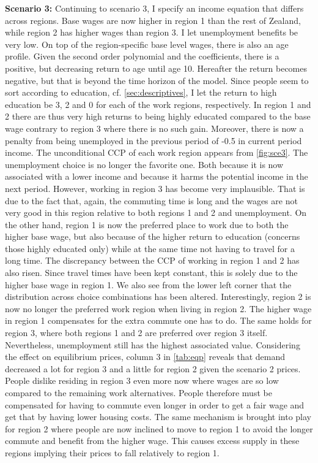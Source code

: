 \textbf{Scenario 3:} Continuing to scenario 3, I specify an income equation that differs across regions. Base wages are now higher in region 1 than the rest of Zealand, while region 2 has higher wages than region 3. I let unemployment benefits be very low. On top of the region-specific base level wages, there is also an age profile. Given the second order polynomial and the coefficients, there is a positive, but decreasing return to age until age 10. Hereafter the return becomes negative, but that is beyond the time horizon of the model. Since people seem to sort according to education, cf. \autoref{sec:descriptives}, I let the return to high education be 3, 2 and 0 for each of the work regions, respectively. In region 1 and 2 there are thus very high returns to being highly educated compared to the base wage contrary to region 3 where there is no such gain. Moreover, there is now a penalty from being unemployed in the previous period of -0.5 in current period income. The unconditional CCP of each work region appears from \autoref{fig:sce3}. The unemployment choice is no longer the favorite one. Both because it is now associated with a lower income and because it harms the potential income in the next period. However, working in region 3 has become very implausible. That is due to the fact that, again, the commuting time is long and the wages are not very good in this region relative to both regions 1 and 2 and unemployment. On the other hand, region 1 is now the preferred place to work due to both the higher base wage, but also because of the higher return to education (concerns those highly educated only) while at the same time not having to travel for a long time. The discrepancy between the CCP of working in region 1 and 2 has also risen. Since travel times have been kept constant, this is solely due to the higher base wage in region 1. We also see from the lower left corner that the distribution across choice combinations has been altered. Interestingly, region 2 is now no longer the preferred work region when living in region 2. The higher wage in region 1 compensates for the extra commute one has to do. The same holds for region 3, where both regions 1 and 2 are preferred over region 3 itself. Nevertheless, unemployment still has the highest associated value. Considering the effect on equilibrium prices, column 3 in \autoref{tab:eqp} reveals that demand decreased a lot for region 3 and a little for region 2 given the scenario 2 prices. People dislike residing in region 3 even more now where wages are so low compared to the remaining work alternatives. People therefore must be compensated for having to commute even longer in order to get a fair wage and get that by having lower housing costs. The same mechanism is brought into play for region 2 where people are now inclined to move to region 1 to avoid the longer commute and benefit from the higher wage. This causes excess supply in these regions implying their prices to fall relatively to region 1. 


